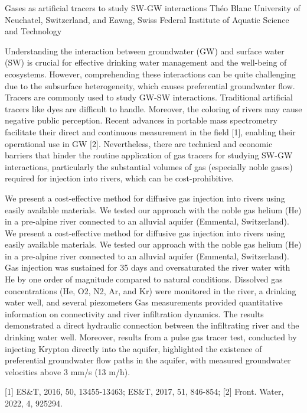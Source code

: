 \begin{conf-abstract}
{Gases as artificial tracers to study SW-GW interactions}
{Théo Blanc}
{University of Neuchatel, Switzerland, and Eawag, Swiss Federal Institute of Aquatic Science and Technology}
{Understanding the interaction between groundwater (GW) and surface water (SW) is crucial for effective drinking water management and the well-being of ecosystems. However, comprehending these interactions can be quite challenging due to the subsurface heterogeneity, which causes preferential groundwater flow.
Tracers are commonly used to study GW-SW interactions. Traditional artificial tracers like dyes are difficult to handle. Moreover, the coloring of rivers may cause negative public perception. Recent advances in portable mass spectrometry facilitate their direct and continuous measurement in the field [1], enabling their operational use in GW [2]. Nevertheless, there are technical and economic barriers that hinder the routine application of gas tracers for studying SW-GW interactions, particularly the substantial volumes of gas (especially noble gases) required for injection into rivers, which can be cost-prohibitive.

We present a cost-effective method for diffusive gas injection into rivers using easily available materials. We tested our approach with the noble gas helium (He) in a pre-alpine river connected to an alluvial aquifer (Emmental, Switzerland). We present a cost-effective method for diffusive gas injection into rivers using easily available materials. We tested our approach with the noble gas helium (He) in a pre-alpine river connected to an alluvial aquifer (Emmental, Switzerland). Gas injection was sustained for 35 days and oversaturated the river water with He by one order of magnitude compared to natural conditions. Dissolved gas concentrations (He, O2, N2, Ar, and Kr) were monitored in the river, a drinking water well, and several piezometers Gas measurements provided quantitative information on connectivity and river infiltration dynamics. The results demonstrated a direct hydraulic connection between the infiltrating river and the drinking water well. Moreover, results from a pulse gas tracer test, conducted by injecting Krypton directly into the aquifer, highlighted the existence of preferential groundwater flow paths in the aquifer, with measured groundwater velocities above 3 mm/s (13 m/h).

[1] ES\&T, 2016, 50, 13455-13463; ES\&T, 2017, 51, 846-854; [2] Front. Water, 2022, 4, 925294.}
\end{conf-abstract}
